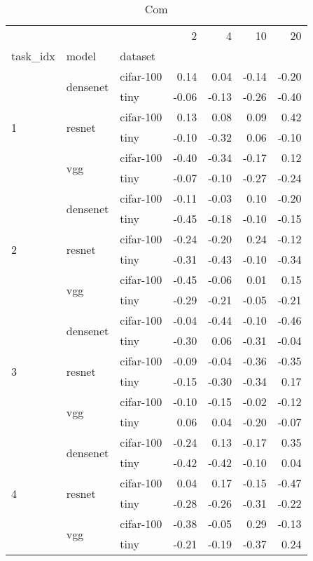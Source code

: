 \begin{table}
\caption{Com}
\begin{tabular}{lllrrrr}
\toprule
 &  &  & 2 & 4 & 10 & 20 \\
task_idx & model & dataset &  &  &  &  \\
\midrule
\multirow[c]{6}{*}{1} & \multirow[c]{2}{*}{densenet} & cifar-100 & 0.14 & 0.04 & -0.14 & -0.20 \\
 &  & tiny & -0.06 & -0.13 & -0.26 & -0.40 \\
 & \multirow[c]{2}{*}{resnet} & cifar-100 & 0.13 & 0.08 & 0.09 & 0.42 \\
 &  & tiny & -0.10 & -0.32 & 0.06 & -0.10 \\
 & \multirow[c]{2}{*}{vgg} & cifar-100 & -0.40 & -0.34 & -0.17 & 0.12 \\
 &  & tiny & -0.07 & -0.10 & -0.27 & -0.24 \\
\multirow[c]{6}{*}{2} & \multirow[c]{2}{*}{densenet} & cifar-100 & -0.11 & -0.03 & 0.10 & -0.20 \\
 &  & tiny & -0.45 & -0.18 & -0.10 & -0.15 \\
 & \multirow[c]{2}{*}{resnet} & cifar-100 & -0.24 & -0.20 & 0.24 & -0.12 \\
 &  & tiny & -0.31 & -0.43 & -0.10 & -0.34 \\
 & \multirow[c]{2}{*}{vgg} & cifar-100 & -0.45 & -0.06 & 0.01 & 0.15 \\
 &  & tiny & -0.29 & -0.21 & -0.05 & -0.21 \\
\multirow[c]{6}{*}{3} & \multirow[c]{2}{*}{densenet} & cifar-100 & -0.04 & -0.44 & -0.10 & -0.46 \\
 &  & tiny & -0.30 & 0.06 & -0.31 & -0.04 \\
 & \multirow[c]{2}{*}{resnet} & cifar-100 & -0.09 & -0.04 & -0.36 & -0.35 \\
 &  & tiny & -0.15 & -0.30 & -0.34 & 0.17 \\
 & \multirow[c]{2}{*}{vgg} & cifar-100 & -0.10 & -0.15 & -0.02 & -0.12 \\
 &  & tiny & 0.06 & 0.04 & -0.20 & -0.07 \\
\multirow[c]{6}{*}{4} & \multirow[c]{2}{*}{densenet} & cifar-100 & -0.24 & 0.13 & -0.17 & 0.35 \\
 &  & tiny & -0.42 & -0.42 & -0.10 & 0.04 \\
 & \multirow[c]{2}{*}{resnet} & cifar-100 & 0.04 & 0.17 & -0.15 & -0.47 \\
 &  & tiny & -0.28 & -0.26 & -0.31 & -0.22 \\
 & \multirow[c]{2}{*}{vgg} & cifar-100 & -0.38 & -0.05 & 0.29 & -0.13 \\
 &  & tiny & -0.21 & -0.19 & -0.37 & 0.24 \\
\bottomrule
\end{tabular}
\end{table}

